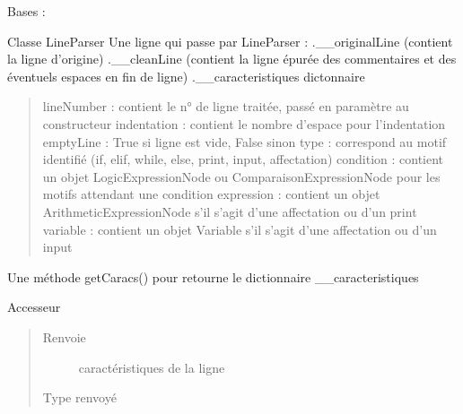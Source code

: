 \documentclass[letterpaper,10pt,french]{sphinxmanual}
\begin{document}
\begin{fulllineitems}
\label{\detokenize{lineparser:lineparser.LineParser}}
Bases : 

Classe LineParser
Une ligne qui passe par LineParser :
.\_\_originalLine (contient la ligne d’origine)
.\_\_cleanLine (contient la ligne épurée des commentaires et des éventuels espaces en fin de ligne)
.\_\_caracteristiques dictonnaire
\begin{quote}

lineNumber  : contient le n° de ligne traitée, passé en paramètre au constructeur
indentation : contient le nombre d’espace pour l’indentation
emptyLine   : True si ligne est vide, False sinon
type        : correspond au motif identifié (if, elif, while, else, print, input, affectation)
condition   : contient un objet LogicExpressionNode ou ComparaisonExpressionNode pour les motifs attendant une condition
expression  : contient un objet ArithmeticExpressionNode s’il s’agit d’une affectation ou d’un print
variable    : contient un objet Variable s’il s’agit d’une affectation ou d’un input
\end{quote}

Une méthode getCaracs() pour retourne le dictionnaire \_\_caracteristiques

\begin{fulllineitems}
\label{\detokenize{lineparser:lineparser.LineParser.getCaracs}}
Accesseur
\begin{quote}\begin{description}
\item[{Renvoie}] \leavevmode
caractéristiques de la ligne

\item[{Type renvoyé}] \leavevmode
{\hyperref[\detokenize{lineparser:lineparser.Caracteristiques}]{}}

\end{description}\end{quote}

\end{fulllineitems}


\end{fulllineitems}
\end{document}
